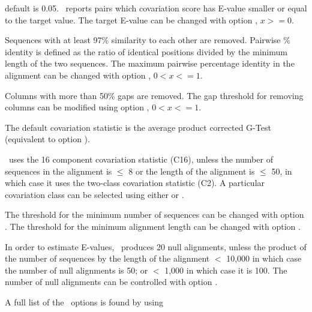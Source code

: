 \begin{sreitems}{}
\item[\emprog{Target E-value:}]default is 0.05. \rscape\, reports
  pairs which covariation score has E-value smaller or equal to the
  target value.  The target E-value can be changed with option
  , $x >= 0$.

\item[\emprog{Pairwise percent identity:}]Sequences with at least
  97\% similarity to each other are removed.  Pairwise \% identity is
  defined as the ratio of identical positions divided by the minimum
  length of the two sequences. The maximum pairwise percentage
  identity in the alignment can be changed with option , $0<x<=1$.

\item[\emprog{Gaps in columns:}]Columns with more than 50\% gaps are
  removed. The gap threshold for removing columns can be modified
   using option  , $0<x<=1$.

 \item[\emprog{Covariation statistic:}]The default covariation statistic
   is the average product corrected G-Test (equivalent to option
   ).

 \item[\emprog{Covariation Class:}]\rscape\ uses the 16 component
   covariation statistic (C16), unless the number of sequences in the
   alignment is $\leq$ 8 or the length of the alignment is $\leq$ 50,
   in which case it uses the two-class covariation statistic (C2). A
   particular covariation class can be selected using either
    or .

   The threshold for the minimum number of sequences can be changed
   with option .  The threshold for the minimum
   alignment length can be changed with option .

 \item[\emprog{Null alignments:}]In order to estimate E-values,
   \rscape\ produces 20 null alignments, unless the product of the
   number of sequences by the length of the alignment $<$ 10,000 in
   which case the number of null alignments is 50; or $<$ 1,000 in
   which case it is 100. The number of null alignments can be
   controlled with option .
 \end{sreitems}

 A full list of the \rscape\ options is found by using


 
 
